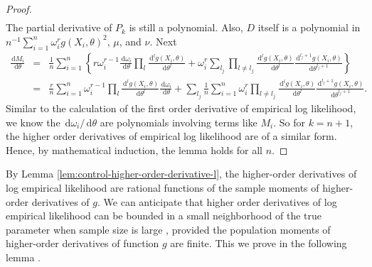 \documentclass[oneside,english]{amsbook}
\numberwithin{section}{chapter}
\numberwithin{equation}{section}
\numberwithin{figure}{section}
\theoremstyle{plain}
\theoremstyle{plain}
\theoremstyle{definition}
\theoremstyle{plain}
\theoremstyle{plain}
\theoremstyle{remark}
\theoremstyle{definition}
\theoremstyle{definition}
\newcommand{\diff}{\,\mathrm{d}}
\begin{document}
\begin{proof}
\begin{eqnarray*}
\end{eqnarray*}
The partial derivative of $P_{k}$ is still a polynomial. Also, $D$
itself is a polynomial in $n^{-1}\sum_{i=1}^{n}\omega_{i}^{r}g\left(X_{i},\theta\right)^2$,
$\mu$, and $\nu$. Next 
\begin{eqnarray*}
\frac{\diff M_{i}}{\diff\theta} & = & \frac{1}{n}\sum_{i=1}^{n}\left\{ r\omega_{i}^{r-1}\frac{\diff\omega_{i}}{\diff\theta}\prod_{l}\frac{\diff^{l}g\left(X_{i},\theta\right)}{\diff\theta^{l}}+\omega_{i}^{r}\sum_{l_{j}}\prod_{l\neq l_{j}}\frac{\diff^{l}g\left(X_{i},\theta\right)}{\diff\theta^{l}}\frac{\diff^{l_{j}+1}g\left(X_{i},\theta\right)}{\diff\theta^{l_{j}+1}}\right\} \\
 & = & \frac{r}{n}\sum_{i=1}^{n}\omega_{i}^{r-1}\prod_{l}\frac{\diff^{l}g\left(X_{i},\theta\right)}{\diff\theta^{l}}\frac{\diff\omega_{i}}{\diff\theta}+\sum_{l_{j}}\frac{1}{n}\sum_{i=1}^{n}\omega_{i}^{r}\prod_{l\neq l_{j}}\frac{\diff^{l}g\left(X_{i},\theta\right)}{\diff\theta^{l}}\frac{\diff^{l_{j}+1}g\left(X_{i},\theta\right)}{\diff\theta^{l_{j}+1}}.
\end{eqnarray*}
Similar to the calculation of the first order derivative of empirical
log likelihood, we know the $\diff\omega_{i}/\diff\theta$ are polynomials
involving terms like $M_{i}$. So for $k=n+1$, the higher order derivatives
of empirical log likelihood are of a similar form. Hence, by mathematical
induction, the lemma holds for all $n$. 
\end{proof}
By Lemma \ref{lem:control-higher-order-derivative-l}, the higher-order derivatives of log empirical likelihood are rational functions of the sample moments of higher-order derivatives of  $g$. We can anticipate
that higher order derivatives of log empirical likelihood can be bounded
in a small neighborhood of the true parameter when sample size is
large , provided the population moments of higher-order derivatives of function $g$ are finite. This we prove in the following lemma .
\end{document}
